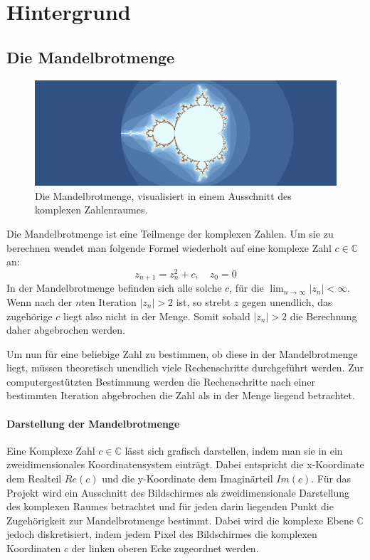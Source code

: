 \section{Hintergrund}

\subsection{Die Mandelbrotmenge}
\begin{figure}
	\centering
	\includegraphics[width=1\linewidth]{img/Einleitung/mandelbrot}
	\caption{Die Mandelbrotmenge, visualisiert in einem Ausschnitt des komplexen Zahlenraumes.}
	\label{fig:mandelbrot_visualisierung_beispiel}
\end{figure}
Die Mandelbrotmenge ist eine Teilmenge der komplexen Zahlen.
Um sie zu berechnen wendet man folgende Formel wiederholt auf eine komplexe Zahl $c \in \mathbb{C}$ an:
\begin{equation}\label{equ:mandelbrot}
	z_{n+1} = z_{n}^2 + c, \quad z_0 = 0
\end{equation}
In der Mandelbrotmenge befinden sich alle solche $c$, für die \( \lim_{n \rightarrow \infty} |z_n| < \infty \).
Wenn nach der \( n \)ten Iteration \( |z_n| > 2 \) ist, so strebt $z$ gegen unendlich, das zugehörige $c$ liegt also nicht in der Menge.
Somit sobald $|z_n| > 2$ die Berechnung daher abgebrochen werden\cite{424331}.

Um nun für eine beliebige Zahl zu bestimmen, ob diese in der Mandelbrotmenge liegt, müssen
theoretisch unendlich viele Rechenschritte durchgeführt werden. Zur computergestützten Bestimmung
werden die Rechenschritte nach einer bestimmten Iteration abgebrochen die Zahl als in der Menge liegend betrachtet.

\paragraph{Darstellung der Mandelbrotmenge}
Eine Komplexe Zahl \( c \in \mathbb{C} \) lässt sich grafisch darstellen, indem man sie in ein zweidimensionales Koordinatensystem einträgt.
Dabei entspricht die x-Koordinate dem Realteil \( Re(c) \) und die y-Koordinate dem Imaginärteil \( Im(c) \).
Für das Projekt wird ein Ausschnitt des Bildschirmes als zweidimensionale Darstellung des komplexen Raumes
betrachtet und für jeden darin liegenden Punkt die Zugehörigkeit zur Mandelbrotmenge bestimmt.
Dabei wird die komplexe Ebene \( \mathbb{C} \) jedoch diskretisiert, indem jedem Pixel des Bildschirmes die komplexen Koordinaten $c$
der linken oberen Ecke zugeordnet werden.

